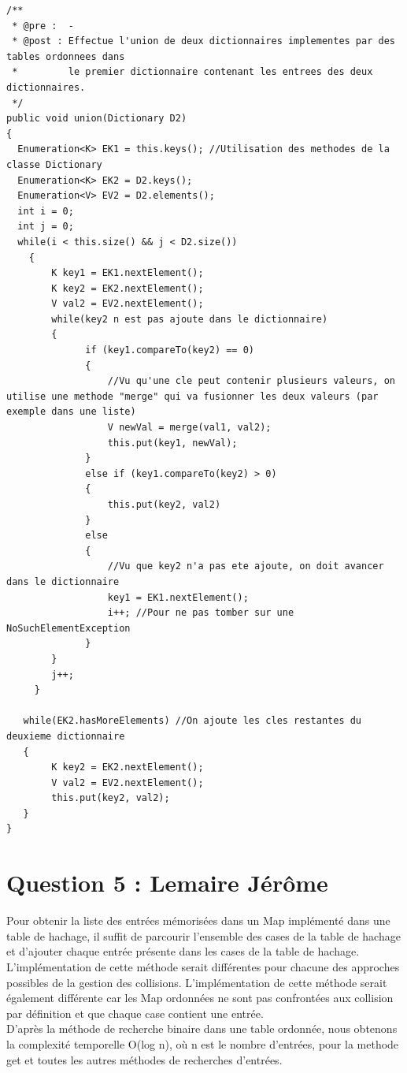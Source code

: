 \documentclass[10pt,a4paper]{article}
\begin{document}
\begin{lstlisting}
/**
 * @pre :  -
 * @post : Effectue l'union de deux dictionnaires implementes par des tables ordonnees dans 
 *         le premier dictionnaire contenant les entrees des deux dictionnaires.
 */
public void union(Dictionary D2)
{
  Enumeration<K> EK1 = this.keys(); //Utilisation des methodes de la classe Dictionary
  Enumeration<K> EK2 = D2.keys();
  Enumeration<V> EV2 = D2.elements();
  int i = 0;
  int j = 0;
  while(i < this.size() && j < D2.size())
	{
	    K key1 = EK1.nextElement(); 
	    K key2 = EK2.nextElement();
	    V val2 = EV2.nextElement();
	    while(key2 n est pas ajoute dans le dictionnaire)
	    {
	          if (key1.compareTo(key2) == 0)
	          {
	              //Vu qu'une cle peut contenir plusieurs valeurs, on utilise une methode "merge" qui va fusionner les deux valeurs (par exemple dans une liste)
	              V newVal = merge(val1, val2); 
		          this.put(key1, newVal);
              }
		      else if (key1.compareTo(key2) > 0)
		      {
		          this.put(key2, val2) 
		      }
		      else
		      {
		          //Vu que key2 n'a pas ete ajoute, on doit avancer dans le dictionnaire
			      key1 = EK1.nextElement();
			      i++; //Pour ne pas tomber sur une NoSuchElementException
		      }
	    }
	    j++;
	 }	
	 
   while(EK2.hasMoreElements) //On ajoute les cles restantes du deuxieme dictionnaire
   {
        K key2 = EK2.nextElement();
        V val2 = EV2.nextElement();
        this.put(key2, val2); 
   }		
}
\end{lstlisting}

\section*{Question 5 : Lemaire Jérôme}


Pour obtenir la liste des entrées mémorisées dans un Map implémenté dans une table de hachage, il suffit de parcourir l'ensemble des cases de la table de hachage et d'ajouter chaque entrée présente dans les cases de la table de hachage. L'implémentation de cette méthode serait différentes pour chacune des approches possibles de la gestion des collisions. L'implémentation de cette méthode serait également différente car les Map ordonnées ne sont pas confrontées aux collision par définition et que chaque case contient une entrée.\\
D'après la méthode de recherche binaire dans une table ordonnée, nous obtenons la complexité temporelle O(log n), où n est le nombre d'entrées, pour la methode get et toutes les autres méthodes de recherches d'entrées.\\
\end{document}
